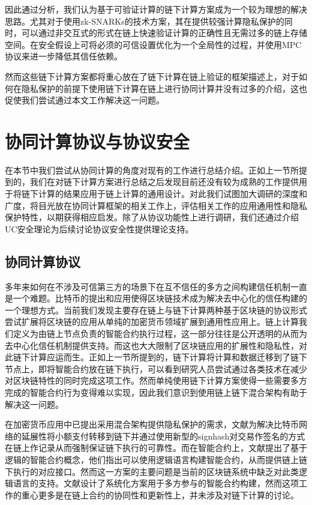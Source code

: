因此通过分析，我们认为基于可验证计算的链下计算方案成为一个较为理想的解决思路。尤其对于使用zk-SNARKs的技术方案，其在提供较强计算隐私保护的同时，可以通过非交互式的形式在链上快速验证计算的正确性且无需过多的链上存储空间。在安全假设上可将必须的可信设置优化为一个全局性的过程，并使用MPC协议来进一步降低其信任依赖。

然而这些链下计算方案都将重心放在了链下计算在链上验证的框架描述上，对于如何在隐私保护的前提下使用链下计算在链上进行协同计算并没有过多的介绍，这也促使我们尝试通过本文工作解决这一问题。

\section{协同计算协议与协议安全}
 在本节中我们尝试从协同计算的角度对现有的工作进行总结介绍。正如上一节所提到的，我们在对链下计算方案进行总结之后发现目前还没有较为成熟的工作提供用于将链下计算的结果应用于链上计算的通用设计。对此我们试图加大调研的深度和广度，将目光放在协同计算框架的相关工作上，评估相关工作的应用通用性和隐私保护特性，以期获得相应启发。除了从协议功能性上进行调研，我们还通过介绍UC安全理论为后续讨论协议安全性提供理论支持。
\subsection{协同计算协议}
多年来如何在不涉及可信第三方的场景下在互不信任的多方之间构建信任机制一直是一个难题。比特币\cite{bitcoin}的提出和应用使得区块链技术成为解决去中心化的信任构建的一个理想方式。当前我们发现主要存在链上与链下计算两种基于区块链的协议形式尝试扩展将区块链的应用从单纯的加密货币领域扩展到通用性应用上。链上计算我们定义为由链上节点负责的智能合约执行过程，这一部分往往是公开透明的从而为去中心化信任机制提供支持。而这也大大限制了区块链应用的扩展性和隐私性，对此链下计算应运而生。正如上一节所提到的，链下计算将计算和数据迁移到了链下节点上，即将智能合约放在链下执行，可以看到研究人员尝试通过各类技术在减少对区块链特性的同时完成这项工作。然而单纯使用链下计算方案使得一些需要多方完成的智能合约行为变得难以实现，因此我们意识到使用链上链下混合架构有助于解决这一问题。

在加密货币应用\cite{bitcoinbook}中已提出采用混合架构提供隐私保护的需求，文献\cite{poon2016bitcoin}为解决比特币网络的延展性将小额支付转移到链下并通过使用新型的signhash对交易作签名的方式在链上作记录从而强制保证链下执行的可靠性。而在智能合约上，文献\cite{idelberger2016evaluation}提出了基于逻辑的智能合约概念，他们指出可以使用逻辑语言构建智能合约，从而提供链上链下执行的对应接口。然而这一方案的主要问题是当前的区块链系统中缺乏对此类逻辑语言的支持。文献\cite{9823371}设计了系统化方案用于多方参与的智能合约构建，然而这项工作的重心更多是在链上合约的协同性和更新性上，并未涉及对链下计算的讨论。

